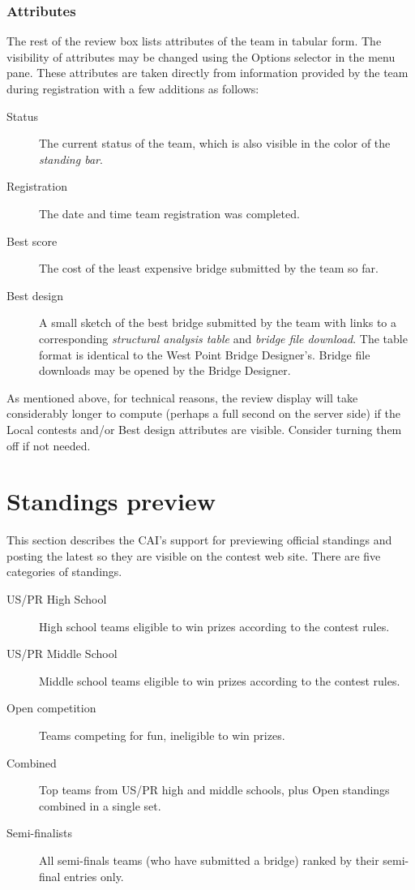 \documentclass[11pt,letterpaper]{refart}
\def\ui#1{\textsf{#1}}
\begin{document}
\subsubsection{Attributes}
The rest of the review box lists attributes of the team in tabular form. The visibility of attributes
may be changed using the \ui{Options} selector in the menu pane. These attributes
are taken directly from information provided by the team during registration with a 
few additions as follows:
\begin{description}
\item[Status] The current status of the team, which is also visible in the 
color of the \emph{standing bar}.
\item[Registration] The date and time team registration was completed.
\item[Best score] The cost of the least expensive bridge submitted by the team so far.
\item[Best design] A small sketch of the best bridge submitted by the team with links
to a corresponding \emph{structural analysis table} and \emph{bridge file download}.
The table format is identical to the West Point Bridge Designer's. Bridge file downloads 
may be opened by the Bridge Designer.
\end{description}
As mentioned above, for technical reasons, the review display will take considerably 
longer to compute (perhaps a full second on the server side) if the \ui{Local contests}  
and/or  \ui{Best design} attributes are visible. Consider turning them off if not needed.

\section{Standings preview}
This section describes the CAI's support for previewing official standings and posting
the latest so they are visible on the contest web site. There are five categories of
standings.
\begin{description}
\item[US/PR High School] High school teams eligible to win prizes according to the contest rules.
\item[US/PR Middle School] Middle school teams eligible to win prizes according to the contest rules.
\item[Open competition] Teams competing for fun, ineligible to win prizes.
\item[Combined] Top teams from US/PR high and middle schools, plus 
Open standings combined in a single set. 
\item[Semi-finalists] All semi-finals teams (who have submitted a bridge) ranked
by their semi-final entries only.
\end{description}
\end{document}
